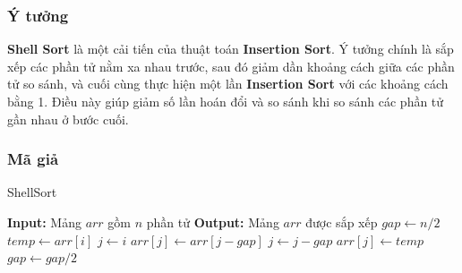 \subsubsection{Ý tưởng}
\textbf{Shell Sort} là một cải tiến của thuật toán \textbf{Insertion Sort}. Ý tưởng chính là sắp xếp các phần tử nằm xa nhau trước, sau đó giảm dần khoảng cách giữa các phần tử so sánh, và cuối cùng thực hiện một lần \textbf{Insertion Sort} với các khoảng cách bằng 1. Điều này giúp giảm số lần hoán đổi và so sánh khi so sánh các phần tử gần nhau ở bước cuối.

\subsubsection{Mã giả}
\begin{algorithm}[H]
\caption{ShellSort}
\begin{algorithmic}[1]
    \State \textbf{Input:} Mảng $arr$ gồm $n$ phần tử
    \State \textbf{Output:} Mảng $arr$ được sắp xếp
    \State $gap \gets n/2$
            \State $temp \gets arr[i]$
            \State $j \gets i$
                \State $arr[j] \gets arr[j - gap]$
                \State $j \gets j - gap$
            \EndWhile
            \State $arr[j] \gets temp$
        \EndFor
        \State $gap \gets gap / 2$
    \EndWhile
\EndProcedure
\end{algorithmic}
\end{algorithm}
